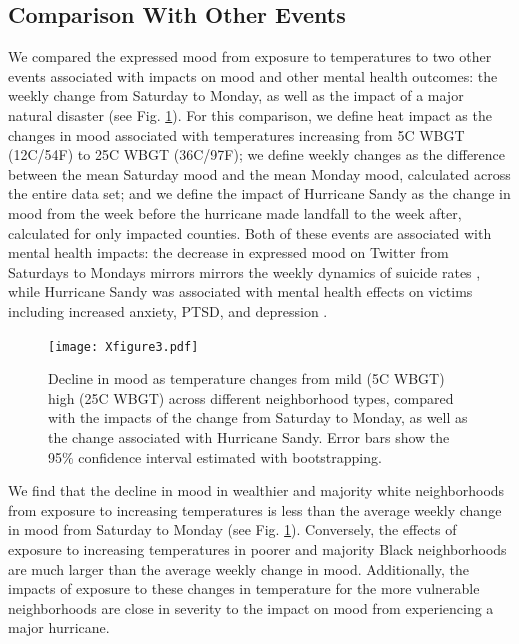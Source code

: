 \documentclass[titlepage]{article}
\begin{document}
\subsection*{Comparison With Other Events}
We compared the expressed mood from exposure to temperatures to two other events associated with impacts on mood and other mental health outcomes: the weekly change from Saturday to Monday, as well as the impact of a major natural disaster (see Fig. \ref{fig:compare}). For this comparison, we define heat impact as the changes in mood associated with temperatures increasing from 5\textdegree C WBGT (12\textdegree C/54\textdegree F) to 25\textdegree C WBGT (36\textdegree C/97\textdegree F); we define weekly changes as the difference between the mean Saturday mood and the mean Monday mood, calculated across the entire data set; and we define the impact of Hurricane Sandy as the change in mood from the week before the hurricane made landfall to the week after, calculated for only impacted counties. Both of these events are associated with mental health impacts: the decrease in expressed mood on Twitter from Saturdays to Mondays mirrors mirrors the weekly dynamics of suicide rates \citep{CDC2021}, while Hurricane Sandy was associated with mental health effects on victims including increased anxiety, PTSD, and depression \citep{Schwartz2017Aug, Lieberman-Cribbin2017}.

\begin{figure}[H]
 \centering
 \texttt{[image: Xfigure3.pdf]}
 \caption{Decline in mood as temperature changes from mild (5\textdegree C WBGT) high (25\textdegree C WBGT) across different neighborhood types, compared with the impacts of the change from Saturday to Monday, as well as the change associated with Hurricane Sandy.  Error bars show the 95\% confidence interval estimated with bootstrapping.}
 \label{fig:compare}
\end{figure}

We find that the decline in mood in wealthier and majority white neighborhoods from exposure to increasing temperatures is less than the average weekly change in mood from Saturday to Monday (see Fig. \ref{fig:compare}). Conversely, the effects of exposure to increasing temperatures in poorer and majority Black neighborhoods are much larger than the average weekly change in mood. Additionally, the impacts of exposure to these changes in temperature for the more vulnerable neighborhoods are close in severity to the impact on mood from experiencing a major hurricane.
\end{document}
